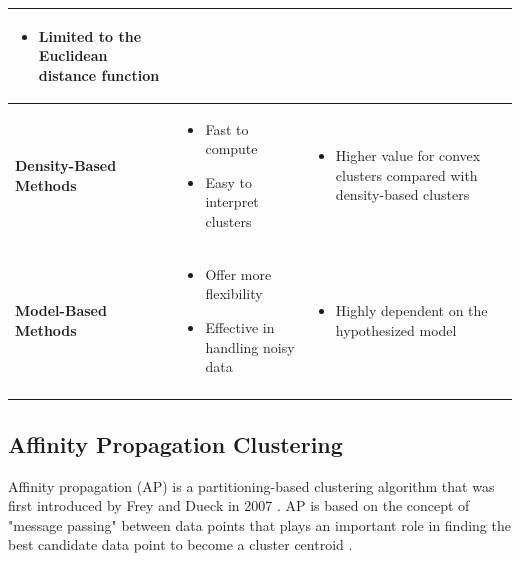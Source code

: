 \begin{table}[!h]
\begin{tabularx}{\linewidth}{p{3cm} p{5.5cm} p{5.5cm}}
\begin{itemize}[*,nosep,leftmargin=0.2cm]
    \item Limited to the Euclidean distance function
\end{itemize}
\tabularnewline \hline
\vfill
 \textbf{Density-Based Methods}
& 
\begin{itemize}[*,nosep,leftmargin=0.2cm]
    \item Fast to compute
    \item Easy to interpret clusters %
\end{itemize}
 &       
\begin{itemize}[*,nosep,leftmargin=0.2cm]
    \item Higher value for convex clusters compared with density-based clusters
\end{itemize}
\tabularnewline \hline
\vfill
 \textbf{Model-Based Methods}
& 
\begin{itemize}[*,nosep,leftmargin=0.2cm]
    \item Offer more flexibility
    \item Effective in handling noisy data            
\end{itemize}
 &       
\begin{itemize}[*,nosep,leftmargin=0.2cm]
    \item Highly dependent on the hypothesized model
\end{itemize} 
\tabularnewline \hline
\vfill
\end{tabularx}
\end{table}



\subsection{Affinity Propagation Clustering}

Affinity propagation (AP) is a partitioning-based clustering algorithm that was first introduced by Frey and Dueck in 2007 \cite{frey2006mixture}. AP is based on the concept of "message passing" between data points that plays an important role in finding the best candidate data point to become a cluster centroid \cite{jiang2019exemplar, frey2007clustering}. 



